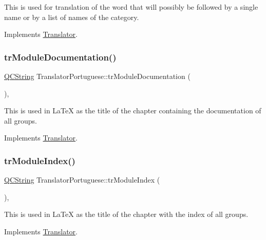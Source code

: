 This is used for translation of the word that will possibly be followed by a single name or by a list of names of the category. 

Implements \mbox{\hyperlink{class_translator}{Translator}}.

\mbox{\label{class_translator_portuguese_a2a27386de1366de0e0e4f38fe73c2c11}} 
\subsubsection{\texorpdfstring{trModuleDocumentation()}{trModuleDocumentation()}}
{\footnotesize\ttfamily \mbox{\hyperlink{class_q_c_string}{Q\+C\+String}} Translator\+Portuguese\+::tr\+Module\+Documentation (\begin{DoxyParamCaption}{ }\end{DoxyParamCaption})\hspace{0.3cm}{\ttfamily [inline]}, {\ttfamily [virtual]}}

This is used in La\+TeX as the title of the chapter containing the documentation of all groups. 

Implements \mbox{\hyperlink{class_translator}{Translator}}.

\mbox{\label{class_translator_portuguese_a98d569061b576d52ac3a20485a3bea74}} 
\subsubsection{\texorpdfstring{trModuleIndex()}{trModuleIndex()}}
{\footnotesize\ttfamily \mbox{\hyperlink{class_q_c_string}{Q\+C\+String}} Translator\+Portuguese\+::tr\+Module\+Index (\begin{DoxyParamCaption}{ }\end{DoxyParamCaption})\hspace{0.3cm}{\ttfamily [inline]}, {\ttfamily [virtual]}}

This is used in La\+TeX as the title of the chapter with the index of all groups. 

Implements \mbox{\hyperlink{class_translator}{Translator}}.

